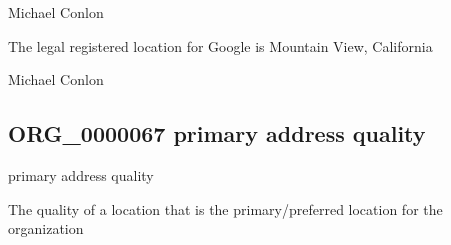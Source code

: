 \documentclass[letterpaper,10pt,english]{sphinxmanual}
\begin{document}
\begin{sphinxShadowBox}

\sphinxAtStartPar
Michael Conlon 
\end{sphinxShadowBox}

\begin{sphinxShadowBox}

\sphinxAtStartPar
The legal registered location for Google is Mountain View, California
\end{sphinxShadowBox}

\begin{sphinxShadowBox}

\sphinxAtStartPar
Michael Conlon 
\end{sphinxShadowBox}
\begin{quote}

\ignorespaces \end{quote}


\subsection{ORG\_0000067 \sphinxhyphen{} primary address quality}
\label{\detokenize{doc-ORG_0000067:org-0000067-primary-address-quality}}\label{\detokenize{doc-ORG_0000067:index-0}}\label{\detokenize{doc-ORG_0000067::doc}}
\begin{sphinxShadowBox}

\sphinxAtStartPar
primary address quality
\end{sphinxShadowBox}

\begin{sphinxShadowBox}

\sphinxAtStartPar
{\hyperref[\detokenize{doc-BFO_0000019::doc}]{}}
\end{sphinxShadowBox}

\begin{sphinxShadowBox}

\sphinxAtStartPar
The quality of a location that is the primary/preferred location for the organization
\end{sphinxShadowBox}
\end{document}
